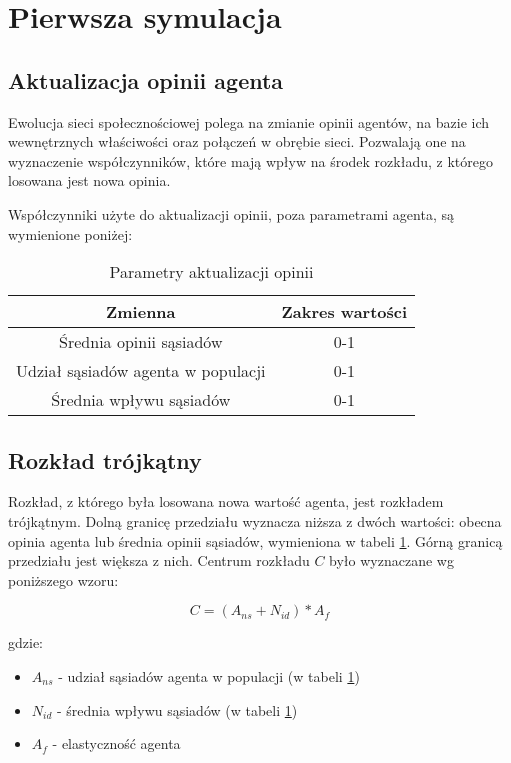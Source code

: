 \section{Pierwsza symulacja}

\subsection{Aktualizacja opinii agenta}
Ewolucja sieci społecznościowej polega na zmianie opinii agentów, na bazie ich wewnętrznych właściwości oraz połączeń w obrębie sieci.
Pozwalają one na wyznaczenie współczynników, które mają wpływ na środek rozkładu, z którego losowana jest nowa opinia.

Współczynniki użyte do aktualizacji opinii, poza parametrami agenta, są wymienione poniżej:
\begin{table}[htbp]
    \centering
    \begin{tabular}{c|c}
        \hline
        Zmienna                            & Zakres wartości \\
        \hline
        Średnia opinii sąsiadów            & 0-1             \\
        Udział sąsiadów agenta w populacji & 0-1             \\
        Średnia wpływu sąsiadów            & 0-1             \\
    \end{tabular}
    \caption{Parametry aktualizacji opinii}
    \label{tab:opinion_update_parameters}
\end{table}

\subsection{Rozkład trójkątny}
Rozkład, z którego była losowana nowa wartość agenta, jest rozkładem trójkątnym.
Dolną granicę przedziału wyznacza niższa z dwóch wartości: obecna opinia agenta lub średnia opinii sąsiadów, wymieniona w tabeli \ref{tab:opinion_update_parameters}.
Górną granicą przedziału jest większa z nich.
Centrum rozkładu $C$ było wyznaczane wg poniższego wzoru:

\begin{equation}
    C = (A_{ns} + N_{id}) * A_f
    \label{eq:triangular_distribution_center}
\end{equation}

gdzie:
\begin{itemize}
    \item $A_{ns}$ - udział sąsiadów agenta w populacji (w tabeli \ref{tab:opinion_update_parameters})
    \item $N_{id}$ - średnia wpływu sąsiadów (w tabeli \ref{tab:opinion_update_parameters})
    \item $A_f$ - elastyczność agenta
\end{itemize}

